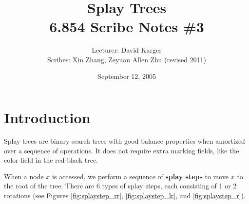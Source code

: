 \documentclass{article}
\title{Splay Trees\\ 6.854 Scribe Notes \#3}
\date{September 12, 2005}
\author{Lecturer: David Karger\\ Scribes: Xin Zhang, Zeyuan Allen Zhu (revised 2011)}
\begin{document}

%
%
%
%

%



\section{Introduction}

Splay trees are binary search trees with good balance properties when
amortized over a sequence of operations. It does not require extra marking fields, like the color field in the red-black tree.

When a node $x$ is accessed, we perform a sequence of \textbf{splay steps}
to move $x$ to the root of the tree. There are 6 types of splay steps,
each consisting of 1 or 2 rotations (see Figures \ref{fig:splaystep_rr},
\ref{fig:splaystep_lr}, and \ref{fig:splaystep_r}).
\end{document}
